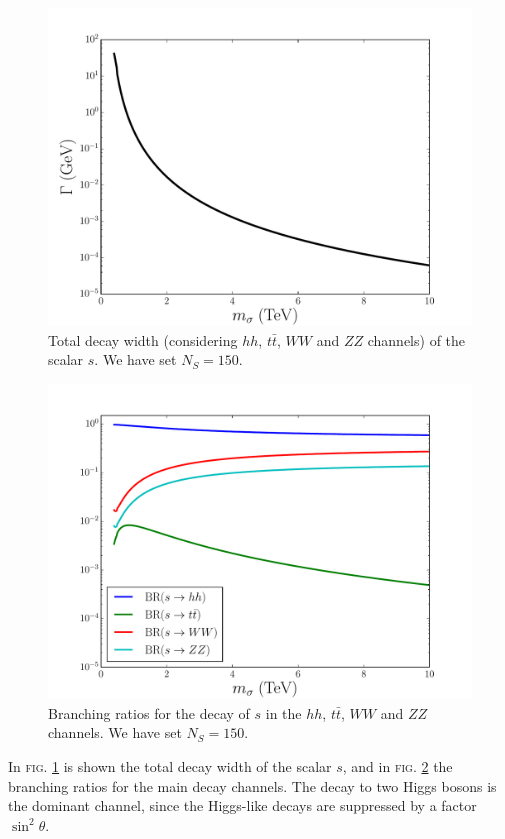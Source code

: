 \documentclass[aps,prd,preprintnumbers,nofootinbibn,twocolumn]{revtex4}
\begin{document}
\begin{figure}[t]
\centering
\includegraphics[width=\columnwidth]{totalwidth}
\caption{Total decay width (considering $hh$, $t\bar{t}$, $WW$ and $ZZ$ channels) of the scalar $s$. We have set $N_S=150$.}\label{fig:totalwidth}
\end{figure}
\begin{figure}[t]
\centering
\includegraphics[width=\columnwidth]{BR}
\caption{Branching ratios for the decay of $s$ in the $hh$, $t\bar{t}$, $WW$ and $ZZ$ channels. We have set $N_S=150$.}\label{fig:BR}
\end{figure}

In \textsc{fig.} \ref{fig:totalwidth} is shown the total decay width of the scalar $s$, and in \textsc{fig.} \ref{fig:BR} the branching ratios for the main decay channels. The decay to two Higgs bosons is the dominant channel, since the Higgs-like decays are suppressed by a factor $\sin^2\theta$.
\end{document}
